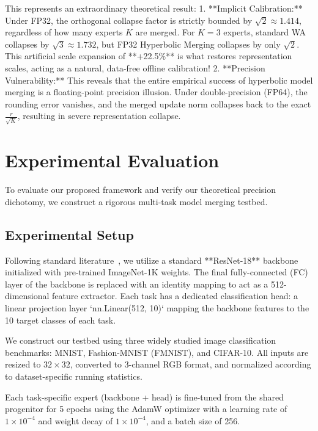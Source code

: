\documentclass{article}
\theoremstyle{plain}
\theoremstyle{definition}
\theoremstyle{remark}
\begin{document}
This represents an extraordinary theoretical result:
1. **Implicit Calibration:** Under FP32, the orthogonal collapse factor is strictly bounded by $\sqrt{2} \approx 1.414$, regardless of how many experts $K$ are merged. For $K=3$ experts, standard WA collapses by $\sqrt{3} \approx 1.732$, but FP32 Hyperbolic Merging collapses by only $\sqrt{2}$. This artificial scale expansion of **+22.5\%** is what restores representation scales, acting as a natural, data-free offline calibration!
2. **Precision Vulnerability:** This reveals that the entire empirical success of hyperbolic model merging is a floating-point precision illusion. Under double-precision (FP64), the rounding error vanishes, and the merged update norm collapses back to the exact $\frac{r}{\sqrt{K}}$, resulting in severe representation collapse.

\section{Experimental Evaluation}
\label{sec:experiments}

To evaluate our proposed framework and verify our theoretical precision dichotomy, we construct a rigorous multi-task model merging testbed.

\subsection{Experimental Setup}
Following standard literature~\cite{anonymous2026deconstruction, anonymous2026deconstruction}, we utilize a standard **ResNet-18** backbone initialized with pre-trained ImageNet-1K weights. The final fully-connected (FC) layer of the backbone is replaced with an identity mapping to act as a 512-dimensional feature extractor. Each task has a dedicated classification head: a linear projection layer `nn.Linear(512, 10)` mapping the backbone features to the 10 target classes of each task.

We construct our testbed using three widely studied image classification benchmarks: MNIST, Fashion-MNIST (FMNIST), and CIFAR-10. All inputs are resized to $32 \times 32$, converted to 3-channel RGB format, and normalized according to dataset-specific running statistics.

Each task-specific expert (backbone + head) is fine-tuned from the shared progenitor for 5 epochs using the AdamW optimizer with a learning rate of $1 \times 10^{-4}$ and weight decay of $1 \times 10^{-4}$, and a batch size of 256. 
\end{document}
